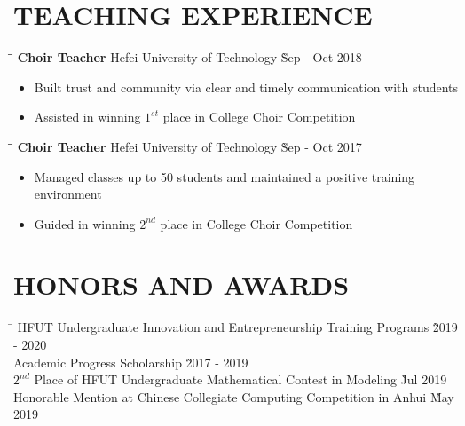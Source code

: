 \documentclass{res}
\begin{document}
\begin{resume}
\vspace{-0.12in}
\section{TEACHING EXPERIENCE}
    \vspace{-0.1in}	
    \begin{tabbing}
    \hspace{2.3in}\= \hspace{2.6in}\= \kill %
    {\bf Choir Teacher} \> Hefei University of Technology     \` Sep - Oct 2018\\
    \end{tabbing}\vspace{-20pt}      %
    \begin{itemize} \itemsep -2pt %
    \item Built trust and community via clear and timely communication with students  
    \item Assisted in winning $1^{st}$ place in College Choir Competition
    \end{itemize}
    \vspace{-0.25in}	
    \begin{tabbing}
    \hspace{2.3in}\= \hspace{2.6in}\= \kill %
    {\bf Choir Teacher} \> Hefei University of Technology     \` Sep - Oct 2017\\
    \end{tabbing}\vspace{-20pt}      %
    \begin{itemize} \itemsep -2pt %
    \item Managed classes up to 50 students and maintained a positive training environment  
    \item Guided in winning $2^{nd}$ place in College Choir Competition
    \end{itemize}

\vspace{-0.15in}	    
\section{HONORS AND AWARDS}  
    \vspace{-0.1in}	
    \begin{tabbing}
    \hspace{5in}\= \kill %
    HFUT Undergraduate Innovation and Entrepreneurship Training Programs \` 2019 - 2020 \\
    Academic Progress Scholarship \` 2017 - 2019  \\
    $2^{nd}$ Place of HFUT Undergraduate Mathematical Contest in Modeling \` Jul 2019 \\
    Honorable Mention at Chinese Collegiate Computing Competition in Anhui \` May 2019 
    \end{tabbing}\vspace{-20pt}      %
   

\end{resume}
\end{document}
